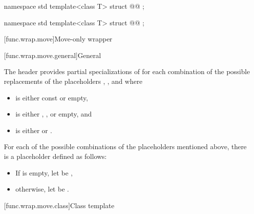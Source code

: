 \begin{codeblock}
namespace std {
  template<class T>
  struct @@ {};
}
\end{codeblock}

\begin{codeblock}
namespace std {
  template<class T>
  struct @@ {};
}
\end{codeblock}

[func.wrap.move]{Move-only wrapper}

[func.wrap.move.general]{General}

\pnum
The header provides partial specializations of  for each combination of the possible replacements of the placeholders \cv{}, , and  where
\begin{itemize}
\item \cv{} is either const or empty,
\item {} is either \tcode{\&}, \tcode{\&\&}, or empty, and
\item {} is either  or .
\end{itemize}

\pnum
For each of the possible combinations of the placeholders mentioned above, there is a placeholder  defined as follows:
\begin{itemize}
\item If  is empty, let  be \cv{}\tcode{\&},
\item otherwise, let  be \cv{} .
\end{itemize}

[func.wrap.move.class]{Class template }

